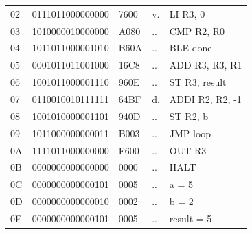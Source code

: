 \begin{tcolorbox}[stepbox, title={Instruction 10 \hfill ticks 28 to 30 \quad JMP loop}]
{\begin{tabular}{@{}lllll@{}}
02 & 0111011000000000 & 7600 & v. & LI R3, 0\\
\rowcolor{pcc}03 & 1010000010000000 & A080 & .. & CMP R2, R0\\
04 & 1011011000001010 & B60A & .. & BLE done\\
05 & 0001011011001000 & 16C8 & .. & ADD R3, R3, R1\\
06 & 1001011000001110 & 960E & .. & ST R3, result\\
07 & 0110010010111111 & 64BF & d. & ADDI R2, R2, -1\\
08 & 1001010000001101 & 940D & .. & ST R2, b\\
09 & 1011000000000011 & B003 & .. & JMP loop\\
0A & 1111011000000000 & F600 & .. & OUT R3\\
0B & 0000000000000000 & 0000 & .. & HALT\\
\rowcolor{datac}0C & 0000000000000101 & 0005 & .. & a = 5\\
\rowcolor{datac}0D & 0000000000000010 & 0002 & .. & b = 2\\
\rowcolor{datac}0E & 0000000000000101 & 0005 & .. & result = 5\\
\end{tabular}}
\end{tcolorbox}\par\vspace{3pt}
